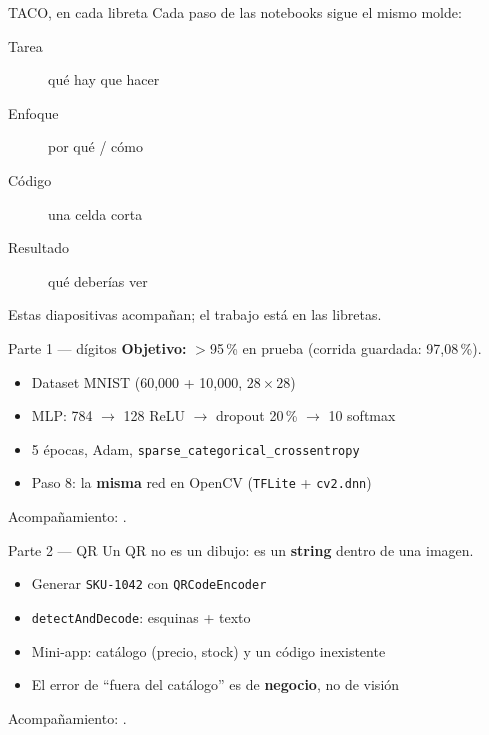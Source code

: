 \documentclass[aspectratio=169]{beamer}
\begin{document}
\begin{frame}{TACO, en cada libreta}
  Cada paso de las notebooks sigue el mismo molde:

  \begin{description}
    \item[Tarea] qué hay que hacer
    \item[Enfoque] por qué / cómo
    \item[Código] una celda corta
    \item[Resultado] qué deberías ver
  \end{description}

  Estas diapositivas acompañan; el trabajo está en las libretas.
\end{frame}

\begin{frame}{Parte 1 --- dígitos}
  \textbf{Objetivo:} $>$95\,\% en prueba (corrida guardada: 97{,}08\,\%).

  \begin{itemize}
    \item Dataset MNIST (60{,}000 + 10{,}000, $28\times28$)
    \item MLP: 784 $\to$ 128 ReLU $\to$ dropout 20\,\% $\to$ 10 softmax
    \item 5 épocas, Adam, \texttt{sparse\_categorical\_crossentropy}
    \item Paso 8: la \textbf{misma} red en OpenCV (\texttt{TFLite} + \texttt{cv2.dnn})
  \end{itemize}

  Acompañamiento: .
\end{frame}

\begin{frame}{Parte 2 --- QR}
  Un QR no es un dibujo: es un \textbf{string} dentro de una imagen.

  \begin{itemize}
    \item Generar \texttt{SKU-1042} con \texttt{QRCodeEncoder}
    \item \texttt{detectAndDecode}: esquinas + texto
    \item Mini-app: catálogo (precio, stock) y un código inexistente
    \item El error de ``fuera del catálogo'' es de \textbf{negocio}, no de visión
  \end{itemize}

  Acompañamiento: .
\end{frame}
\end{document}
